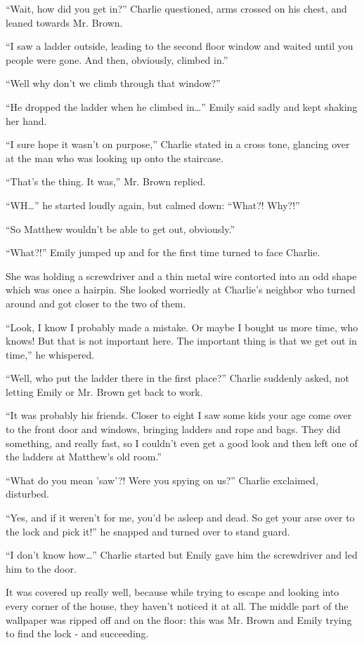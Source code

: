 “Wait, how did you get in?” Charlie questioned, arms crossed on his chest, and leaned towards Mr. Brown.

“I saw a ladder outside, leading to the second floor window and waited until you people were gone. And then, obviously, climbed in.”

“Well why don't we climb through that window?”

“He dropped the ladder when he climbed in…” Emily said sadly and kept shaking her hand.

“I sure hope it wasn't on purpose,” Charlie stated in a cross tone, glancing over at the man who was looking up onto the staircase.

“That's the thing. It was,” Mr. Brown replied.

“WH…” he started loudly again, but calmed down: “What?! Why?!”

“So Matthew wouldn't be able to get out, obviously.”

“What?!” Emily jumped up and for the first time turned to face Charlie.

She was holding a screwdriver and a thin metal wire contorted into an odd shape which was once a hairpin. She looked worriedly at Charlie's neighbor who turned around and got closer to the two of them.

“Look, I know I probably made a mistake. Or maybe I bought us more time, who knows! But that is not important here. The important thing is that we get out in time,” he whispered.

“Well, who put the ladder there in the first place?” Charlie suddenly asked, not letting Emily or Mr. Brown get back to work.

“It was probably his friends. Closer to eight I saw some kids your age come over to the front door and windows, bringing ladders and rope and bags. They did something, and really fast, so I couldn't even get a good look and then left one of the ladders at Matthew's old room.”

“What do you mean 'saw'?! Were you spying on us?” Charlie exclaimed, disturbed.

“Yes, and if it weren't for me, you'd be asleep and dead. So get your arse over to the lock and pick it!” he snapped and turned over to stand guard.

“I don't know how…” Charlie started but Emily gave him the screwdriver and led him to the door.

It was covered up really well, because while trying to escape and looking into every corner of the house, they haven't noticed it at all. The middle part of the wallpaper was ripped off and on the floor: this was Mr. Brown and Emily trying to find the lock - and succeeding.


